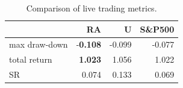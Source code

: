 \begin{table}[ht!]
   \begin{minipage}{0.48\textwidth}
        \begin{tabular}{||l|r r r||}
        \hline
        & RA & U & S\&P500\\
        \hline
        max draw-down & -\textbf{0.108}& -0.099 & -0.077\\
        total return & \textbf{1.023} & 1.056 & 1.022\\
        SR & 0.074 & 0.133 & 0.069\\
        \hline
        \end{tabular}
      \caption{Comparison of live trading metrics.}
        \label{tab:live_metrics}
  \end{minipage}
\end{table}
